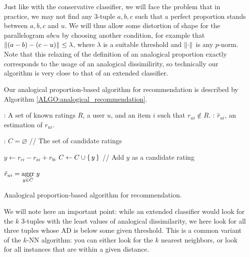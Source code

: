 Just like with the conservative classifier, we will face the problem that in
practice, we may not find any $3$-tuple $a, b, c$ such that a perfect
proportion stands between $a, b, c$ and $u$. We will thus allow some distortion
of shape for the parallelogram $abcu$ by choosing another condition, for
example that ${\left\lVert(a-b) - (c-u)\right\rVert}_{} \leq \lambda$, where $\lambda$ is a
suitable threshold and ${\left\lVert\cdot\right\rVert}_{}$ is any $p$-norm. Note that this
relaxing of the definition of an analogical proportion exactly corresponds to
the usage of an analogical dissimilirity, so technically our algorithm is very
close to that of an extended classifier.

Our analogical proportion-based algorithm for recommendation is described by
Algorithm \ref{ALGO:analogical_recommendation}.
 \begin{algorithm}[!ht]
       \begin{algorithmic}

      : A set of known ratings $R$, a user $u$, and an item
         $i$ such that $r_{ui} \notin R$.
      : $\hat{r}_{ui}$, an estimation of $r_{ui}$.

      :
      \STATE $C = \varnothing$ \quad \quad // The set of candidate ratings

      \STATE  $y \leftarrow r_{ci} - r_{ai} + r_{bi}$
      \STATE $C \gets C \cup \set{y}$ \quad // Add $y$ as a candidate rating
	  \ENDFOR

    \STATE $\hat{r}_{ui} = \underset{y \in C}{\operatorname{aggr}}\; y$

\end{algorithmic}
     \caption{Analogical proportion-based algorithm for recommendation.}
       \label{ALGO:analogical_recommendation}
\end{algorithm}

We will note here an important point: while an extended classifier would look
for the $k$ $3$-tuples with the least values of analogical dissimilarity, we
here look for all three tuples whose AD is below some given threshold. This is
a common variant of the $k$-NN algorithm: you can either look for the $k$
nearest neighbors, or look for all instances that are within a given distance.

